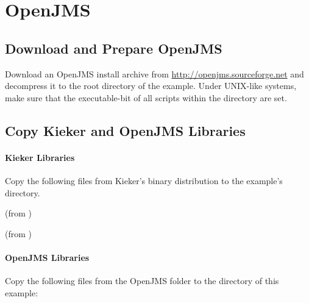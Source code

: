 \section{OpenJMS}\label{example:jms:openjms}

\subsection{Download and Prepare OpenJMS}

Download an OpenJMS install archive from \url{http://openjms.sourceforge.net} %
and decompress it to the root directory of the example. Under UNIX-like systems, make sure that the executable-bit of all scripts within the  directory are set.

\subsection{Copy Kieker and OpenJMS Libraries}

\paragraph*{Kieker Libraries}

Copy the following files from Kieker's binary distribution to %
the example's  directory.

\medskip

\begin{compactenum}
 \item \file{\mainJarEMF} (from )
 \item \file{\commonsLoggingJar} (from )
\end{compactenum}

\paragraph*{OpenJMS Libraries}

Copy the following files from the OpenJMS  folder to the %
 directory of this example:

\medskip

\begin{compactenum}
\item {}
\item {}
\item {}
\item {}
\item {}
\item {}
\end{compactenum}

